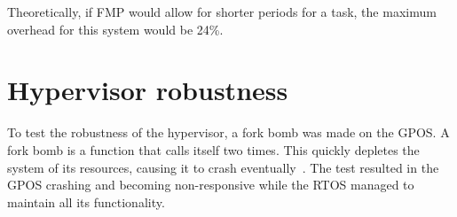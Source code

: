 Theoretically, if FMP would allow for shorter periods for a task, the maximum overhead for this system would be 24\%.

\section{Hypervisor robustness}
To test the robustness of the hypervisor, a fork bomb was made on the GPOS. A fork bomb is a function that calls itself two times. This quickly depletes the system of its resources, causing it to crash eventually~\cite{forkbomb}. The test resulted in the GPOS crashing and becoming non-responsive while the RTOS managed to maintain all its functionality.\\

